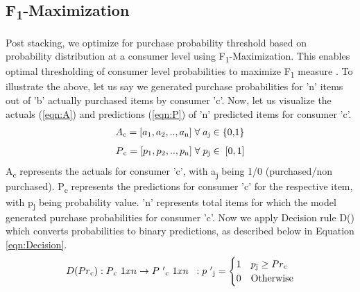 \subsection{F\textsubscript{1}-Maximization}
Post stacking, we optimize for purchase probability threshold based on
probability distribution at a consumer level using F\textsubscript{1}-Maximization.
This enables optimal thresholding of consumer level probabilities to  maximize F\textsubscript{1} measure \cite{lipton2014optimal}.
To illustrate the above, let us say we generated purchase probabilities for 
'n' items out of 'b' actually purchased items by consumer 'c'. Now, let us visualize the actuals (\ref{eqn:A}) 
and predictions (\ref{eqn:P})  of 'n' predicted items for consumer 'c'.
  \begin{equation}
    \begin{array}{l}
      A\textsubscript{c} = [a\textsubscript{1}, a\textsubscript{2}, .., a\textsubscript{n}] 
       \; \forall \; a\textsubscript{j} \in \; $\{0,1\}$
    \end{array}
    \label{eqn:A}
  \end{equation}
  \begin{equation}
    \begin{array}{l}
      P\textsubscript{c} = [p\textsubscript{1}, p\textsubscript{2}, .., p\textsubscript{n}]
      \; \forall \; p\textsubscript{j} \in \; [0,1]
    \end{array}
    \label{eqn:P}
  \end{equation}
A\textsubscript{c} represents the actuals for consumer 'c', with a\textsubscript{j} being 1/0 
(purchased/non purchased). P\textsubscript{c} represents the predictions 
for consumer 'c' for the respective item, with p\textsubscript{j} being probability value. 
'n' represents total items for which the model generated purchase probabilities for consumer 'c'.
Now we apply Decision rule D() which converts probabilities to binary predictions, as described below 
in Equation \ref{eqn:Decision}.
  \begin{equation}
    \begin{array}{l}
      D(Pr\textsubscript{c}) : P\textsubscript{c}\textsuperscript{1 x n}
      \to P\textsuperscript{'}\textsubscript{c}\textsuperscript{1 x n}
      \;\; : p\textsuperscript{'}\textsubscript{j} = 
        \begin{cases}
          1 & p\textsubscript{j} \geq Pr\textsubscript{c} \\
          0 & \text{Otherwise}
        \end{cases}
    \end{array}
    \label{eqn:Decision}
  \end{equation}
